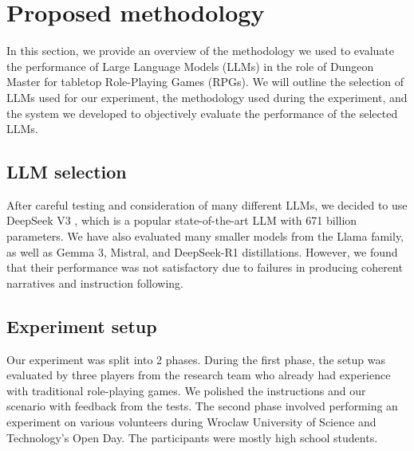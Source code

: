 \documentclass[runningheads]{llncs}
\begin{document}
\section{Proposed methodology}
In this section, we provide an overview of the methodology we used to evaluate the performance of Large Language Models (LLMs) in the role of Dungeon Master for tabletop Role-Playing Games (RPGs). We will outline the selection of LLMs used for our experiment, the methodology used during the experiment, and the system we developed to objectively evaluate the performance of the selected LLMs.
\subsection{LLM selection}
After careful testing and consideration of many different LLMs, we decided to use DeepSeek V3 \cite{ref_6}, which is a popular state-of-the-art LLM with 671 billion parameters. We have also evaluated many smaller models from the Llama family, as well as Gemma 3, Mistral, and DeepSeek-R1 distillations. However, we found that their performance was not satisfactory due to failures in producing coherent narratives and instruction following.
\subsection{Experiment setup}
Our experiment was split into 2 phases. During the first phase, the setup was evaluated by three players from the research team who already had experience with traditional role-playing games. We polished the instructions and our scenario with feedback from the tests. The second phase involved performing an experiment on various volunteers during Wroclaw University of Science and Technology's Open Day. The participants were mostly high school students.
\end{document}
